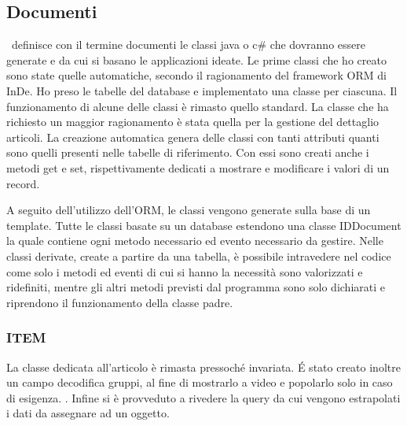 \subsection{Documenti}
\inde\ definisce con il termine documenti le classi java o c\# che dovranno essere generate e da cui si basano le applicazioni ideate.
Le prime classi che ho creato sono state quelle automatiche, secondo il ragionamento del framework ORM di InDe. Ho preso le tabelle del database e implementato una classe per ciascuna. Il funzionamento di alcune delle classi è rimasto quello standard. La classe che ha richiesto un  maggior ragionamento è stata quella per la gestione del dettaglio articoli.
La creazione automatica genera delle classi con tanti attributi quanti sono quelli presenti nelle tabelle di riferimento. Con essi sono creati anche i metodi get e set, rispettivamente dedicati a mostrare e modificare i valori di un record.

A seguito dell'utilizzo dell'ORM, le classi vengono generate sulla base di un template. Tutte le classi basate su un database estendono una classe IDDocument la quale contiene ogni metodo necessario ed evento necessario da gestire. Nelle classi derivate, create a partire da una tabella, è possibile intravedere nel codice come solo i metodi ed eventi di cui si hanno la necessità sono valorizzati e ridefiniti, mentre gli altri metodi previsti dal programma sono solo dichiarati e riprendono il funzionamento della classe padre.



\subsubsection{ITEM}
La classe dedicata all'articolo è rimasta pressoché invariata. \'E stato creato inoltre un campo decodifica gruppi, al fine di mostrarlo a video e popolarlo solo in caso di esigenza. . Infine si è provveduto a rivedere la query da cui vengono estrapolati i dati da assegnare ad un oggetto.


